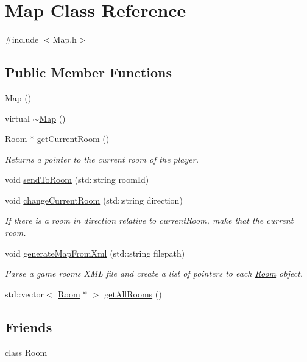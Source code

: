 \hypertarget{class_map}{}\section{Map Class Reference}
\label{class_map}


{\ttfamily \#include $<$Map.\+h$>$}

\subsection*{Public Member Functions}
\begin{DoxyCompactItemize}
\item 
\mbox{\hyperlink{class_map_a0f5ad0fd4563497b4214038cbca8b582}{Map}} ()
\item 
virtual \mbox{\hyperlink{class_map_aa403fbe09394ccf39747588f5168e3b2}{$\sim$\+Map}} ()
\item 
\mbox{\hyperlink{class_room}{Room}} $\ast$ \mbox{\hyperlink{class_map_a633d0645e512555cd955c1247d597640}{get\+Current\+Room}} ()
\begin{DoxyCompactList}\small\item\em Returns a pointer to the current room of the player. \end{DoxyCompactList}\item 
void \mbox{\hyperlink{class_map_a0c82625bc062af1b5e058978350811f0}{send\+To\+Room}} (std\+::string room\+Id)
\item 
void \mbox{\hyperlink{class_map_ab5777622a2e795cb5b36c7bd4843e5a8}{change\+Current\+Room}} (std\+::string direction)
\begin{DoxyCompactList}\small\item\em If there is a room in direction relative to current\+Room, make that the current room. \end{DoxyCompactList}\item 
void \mbox{\hyperlink{class_map_a74c4184090bdc9c3043d1a5df4521572}{generate\+Map\+From\+Xml}} (std\+::string filepath)
\begin{DoxyCompactList}\small\item\em Parse a game rooms X\+ML file and create a list of pointers to each \mbox{\hyperlink{class_room}{Room}} object. \end{DoxyCompactList}\item 
std\+::vector$<$ \mbox{\hyperlink{class_room}{Room}} $\ast$ $>$ \mbox{\hyperlink{class_map_ac78c08609c86b0a3ab1e731c70a3aaf3}{get\+All\+Rooms}} ()
\end{DoxyCompactItemize}
\subsection*{Friends}
\begin{DoxyCompactItemize}
\item 
class \mbox{\hyperlink{class_map_ad579dfb5bd3be0d05d8775896307d9b3}{Room}}
\end{DoxyCompactItemize}


